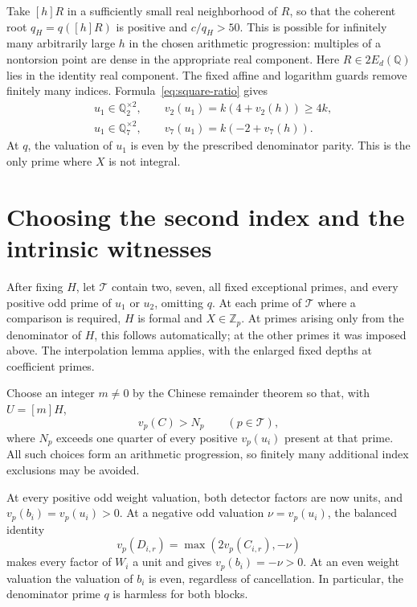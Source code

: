 \documentclass[11pt,a4paper]{article}
\newcommand{\Q}{\mathbb Q}\newcommand{\Z}{\mathbb Z}
\begin{document}
Take $[h]R$ in a sufficiently small real neighborhood of $R$,
so that the coherent root $q_H=q([h]R)$ is positive and
$c/q_H>50$. This is possible for infinitely many arbitrarily
large $h$ in the chosen arithmetic progression: multiples of
a nontorsion point are dense in the appropriate real component.
Here $R\in2E_d(\Q)$ lies in the identity real component.
The fixed affine and logarithm guards remove finitely many
indices. Formula~\eqref{eq:square-ratio} gives
\begin{equation}\label{eq:weight-fixed}
 \begin{split}
 &u_1\in\Q_2^{\times2},\qquad
       v_2(u_1)=k(4+v_2(h))\ge4k,\\
 &u_1\in\Q_7^{\times2},\qquad
       v_7(u_1)=k(-2+v_7(h)).
 \end{split}
\end{equation}
At $q$, the valuation of $u_1$ is even by the prescribed
denominator parity. This is the only prime where $X$ is not
integral.

\section{Choosing the second index and the intrinsic witnesses}

After fixing $H$, let $\mathcal T$ contain two, seven, all fixed
exceptional primes, and every positive odd prime of $u_1$ or
$u_2$, omitting $q$. At each prime of $\mathcal T$ where a
comparison is required, $H$ is formal and $X\in\Z_p$.
At primes arising only from the denominator of $H$, this follows
automatically; at the other primes it was imposed above.
The interpolation lemma applies, with the enlarged fixed depths
at coefficient primes.

Choose an integer $m\ne0$ by the Chinese remainder theorem so
that, with $U=[m]H$,
\[
 v_p(C)>N_p\qquad(p\in\mathcal T),
\]
where $N_p$ exceeds one quarter of every positive $v_p(u_i)$
present at that prime. All such choices form an arithmetic
progression, so finitely many additional index exclusions may
be avoided.

At every positive odd weight valuation, both detector factors
are now units, and $v_p(b_i)=v_p(u_i)>0$. At a negative odd
valuation $\nu=v_p(u_i)$, the balanced identity
\[
             v_p(D_{i,r})=\max(2v_p(C_{i,r}),-\nu)
\]
makes every factor of $W_i$ a unit and gives
$v_p(b_i)=-\nu>0$. At an even weight valuation the valuation
of $b_i$ is even, regardless of cancellation. In particular,
the denominator prime $q$ is harmless for both blocks.
\end{document}
